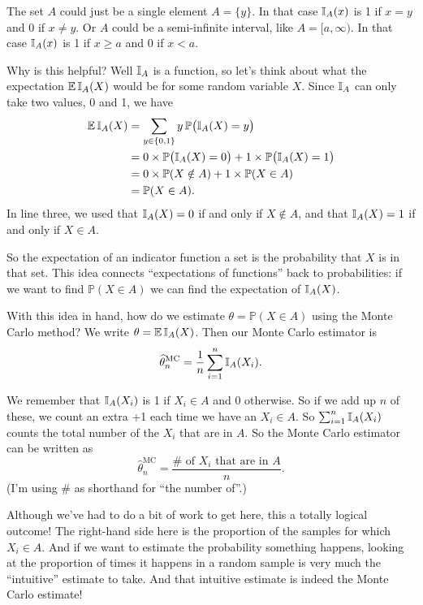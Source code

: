 \documentclass[
  letterpaper,
  DIV=11,
  numbers=noendperiod]{scrreprt}
\theoremstyle{plain}
\theoremstyle{definition}
\theoremstyle{definition}
\theoremstyle{remark}
\begin{document}
The set \(A\) could just be a single element \(A = \{y\}\). In that case
\(\mathbb{I}_A(x)\) is 1 if \(x = y\) and 0 if \(x \neq y\). Or \(A\) could be
a semi-infinite interval, like \(A = [a, \infty)\). In that case
\(\mathbb{I}_A(x)\) is 1 if \(x \geq a\) and 0 if \(x < a\).

Why is this helpful? Well \(\mathbb{I}_A\) is a function, so let's think about
what the expectation \(\operatorname{\mathbb{E}} \mathbb{I}_A(X)\) would be for some random
variable \(X\). Since \(\mathbb{I}_A\) can only take two values, 0 and 1, we
have \[ \begin{align*}
\operatorname{\mathbb{E}} \mathbb{I}_A(X) &= \sum_{y \in\{0,1\}} y\,\mathbb P\big( \mathbb{I}_A(X) = y \big) \\\
  &= 0 \times \mathbb P\big( \mathbb{I}_A(X) = 0 \big) + 1 \times \mathbb P\big( \mathbb{I}_A(X) = 1 \big) \\
  &= 0 \times \mathbb P(X \notin A) + 1 \times \mathbb P(X \in A) \\
  &= \mathbb P(X \in A) .
\end{align*} \] In line three, we used that \(\mathbb{I}_A(X) = 0\) if and
only if \(X \notin A\), and that \(\mathbb{I}_A(X) = 1\) if and only if
\(X \in A\).

So the expectation of an indicator function a set is the probability
that \(X\) is in that set. This idea connects ``expectations of
functions'' back to probabilities: if we want to find
\(\mathbb P(X \in A)\) we can find the expectation of \(\mathbb{I}_A(X)\).

With this idea in hand, how do we estimate
\(\theta = \mathbb P(X \in A)\) using the Monte Carlo method? We write
\(\theta = \operatorname{\mathbb{E}}\mathbb{I}_A(X)\). Then our Monte Carlo estimator is
\[  \widehat{\theta}_n^{\mathrm{MC}} = \frac{1}{n} \sum_{i=1}^n \mathbb{I}_A(X_i) . \]

We remember that \(\mathbb{I}_A(X_i)\) is 1 if \(X_i \in A\) and 0 otherwise.
So if we add up \(n\) of these, we count an extra +1 each time we have
an \(X_i \in A\). So \(\sum_{i=1}^n \mathbb{I}_A(X_i)\) counts the total
number of the \(X_i\) that are in \(A\). So the Monte Carlo estimator
can be written as
\[  \widehat{\theta}_n^{\mathrm{MC}} = \frac{\# \text{ of } X_i \text{ that are in $A$}}{n} . \]
(I'm using \(\#\) as shorthand for ``the number of''.)

Although we've had to do a bit of work to get here, this a totally
logical outcome! The right-hand side here is the proportion of the
samples for which \(X_i \in A\). And if we want to estimate the
probability something happens, looking at the proportion of times it
happens in a random sample is very much the ``intuitive'' estimate to
take. And that intuitive estimate is indeed the Monte Carlo estimate!
\end{document}
